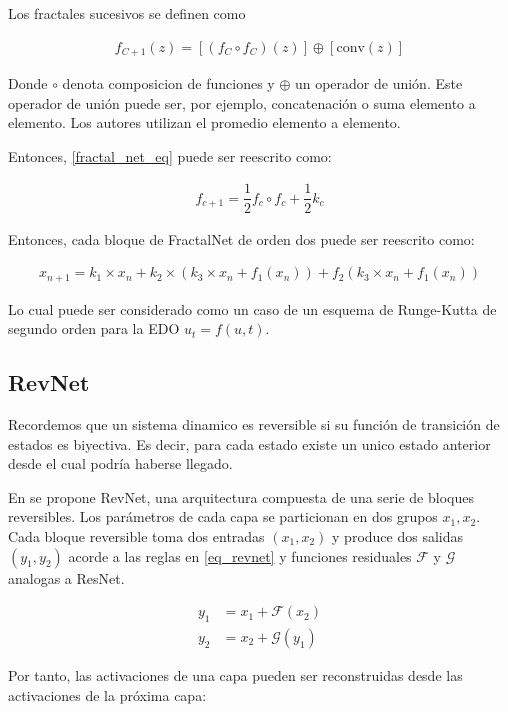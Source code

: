 \documentclass[titlepage,a4paper,oneside]{article}
\begin{document}
Los fractales sucesivos se definen como

\begin{align}\label{fractal_net_eq}
	f_{C+1}(z) = \left[ (f_C \circ f_C)(z) \right] \oplus \left[ \text{conv}(z) \right]
\end{align}

Donde $\circ$ denota composicion de funciones y $\oplus$ un operador de unión. Este operador de unión puede ser, por ejemplo, concatenación o suma elemento a elemento. Los autores utilizan el promedio elemento a elemento.

Entonces, \ref{fractal_net_eq} puede ser reescrito como:

\begin{align}
	f_{c+1} = \dfrac{1}{2} f_c \circ f_c + \dfrac{1}{2} k_c
\end{align}

Entonces, cada bloque de FractalNet de orden dos puede ser reescrito como:

\begin{align}
	x_{n+1} = k_1 \times x_n + k_2 \times (k_3 \times x_n + f_1(x_n)) + f_2 (k_3 \times x_n + f_1(x_n))
\end{align}

Lo cual puede ser considerado como un caso de un esquema de Runge-Kutta de segundo orden para la EDO $u_t = f(u,t)$.

\subsection{RevNet}
Recordemos que un sistema dinamico es reversible si su función de transición de estados es biyectiva. Es decir, para cada estado existe un unico estado anterior desde el cual podría haberse llegado.

En \cite{gomez2017reversible} se propone RevNet, una arquitectura compuesta de una serie de bloques reversibles. Los parámetros de cada capa se particionan en dos grupos $x_1, x_2$. Cada bloque reversible toma dos entradas $(x_1, x_2)$ y produce dos salidas $(y_1, y_2)$ acorde a las reglas en \ref{eq_revnet} y funciones residuales $\mathscr{F}$ y $\mathscr{G}$ analogas a ResNet.

\begin{align}\label{eq_revnet}
	y_1 &= x_1 + \mathscr{F}(x_2) \\
	y_2 &= x_2 + \mathscr{G}(y_1)
\end{align}

Por tanto, las activaciones de una capa pueden ser reconstruidas desde las activaciones de la próxima capa:
\end{document}
